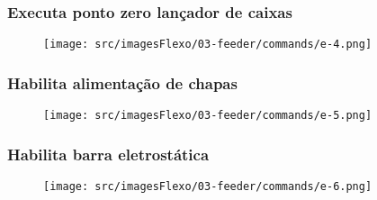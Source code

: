\newpage
\thispagestyle{fancy}
\vspace*{\fill}
\subsubsection{\small{Executa ponto zero lançador de caixas}}
\begin{figure}[h]
  \centering
  \texttt{[image: src/imagesFlexo/03-feeder/commands/e-4.png]}
\end{figure}
\vspace*{\fill}

\newpage
\thispagestyle{fancy}
\vspace*{\fill}
\subsubsection{\small{Habilita alimentação de chapas}}
\begin{figure}[h]
  \centering
  \texttt{[image: src/imagesFlexo/03-feeder/commands/e-5.png]}
\end{figure}
\vspace*{\fill}

\newpage
\thispagestyle{fancy}
\vspace*{\fill}
\subsubsection{\small{Habilita barra eletrostática}}
\begin{figure}[h]
  \centering
  \texttt{[image: src/imagesFlexo/03-feeder/commands/e-6.png]}
\end{figure}
\vspace*{\fill}